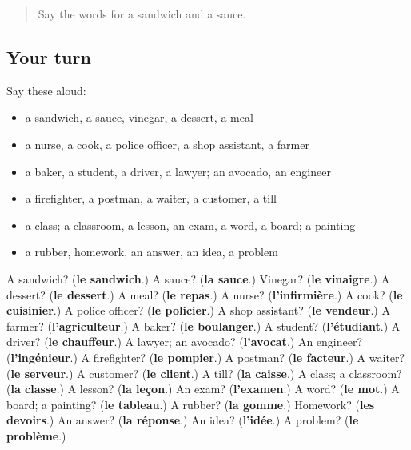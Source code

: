 \begin{quote}
Say the words for a sandwich and a sauce.
\end{quote}

\subsection*{Your turn}
Say these aloud:

\begin{itemize}
\raggedright
  \item a sandwich, a sauce, vinegar, a dessert, a meal
  \item a nurse, a cook, a police officer, a shop assistant, a farmer
  \item a baker, a student, a driver, a lawyer; an avocado, an engineer
  \item a firefighter, a postman, a waiter, a customer, a till
  \item a class; a classroom, a lesson, an exam, a word, a board; a painting
  \item a rubber, homework, an answer, an idea, a problem
\end{itemize}

\begin{tcolorbox}[breakable,colback=teal!4,colframe=teal!35!black,title={Before you move on}]
A sandwich? (\textbf{le sandwich}.) A sauce? (\textbf{la sauce}.) Vinegar? (\textbf{le vinaigre}.) A dessert? (\textbf{le dessert}.) A meal? (\textbf{le repas}.) A nurse? (\textbf{l'infirmière}.) A cook? (\textbf{le cuisinier}.) A police officer? (\textbf{le policier}.) A shop assistant? (\textbf{le vendeur}.) A farmer? (\textbf{l'agriculteur}.) A baker? (\textbf{le boulanger}.) A student? (\textbf{l'étudiant}.) A driver? (\textbf{le chauffeur}.) A lawyer; an avocado? (\textbf{l'avocat}.) An engineer? (\textbf{l'ingénieur}.) A firefighter? (\textbf{le pompier}.) A postman? (\textbf{le facteur}.) A waiter? (\textbf{le serveur}.) A customer? (\textbf{le client}.) A till? (\textbf{la caisse}.) A class; a classroom? (\textbf{la classe}.) A lesson? (\textbf{la leçon}.) An exam? (\textbf{l'examen}.) A word? (\textbf{le mot}.) A board; a painting? (\textbf{le tableau}.) A rubber? (\textbf{la gomme}.) Homework? (\textbf{les devoirs}.) An answer? (\textbf{la réponse}.) An idea? (\textbf{l'idée}.) A problem? (\textbf{le problème}.)
\end{tcolorbox}
